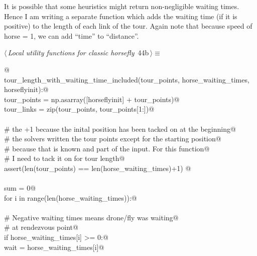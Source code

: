 \documentclass[11.5pt]{report}
\begin{document}
\vspace{-0.8cm}\newchunk It is possible that some heuristics might return non-negligible
      waiting times. Hence I am writing a separate function which
      adds the waiting time (if it is positive) to the length of 
      each link of the tour. Again note that because 
      speed of horse = 1, we can add ``time'' to ``distance''. 

\begin{flushleft} \small\label{scrap53}\raggedright\small
{} $\langle\,${\itshape Local utility functions for classic horsefly}\nobreak\ {\footnotesize {44b}}$\,\rangle\equiv$
\vspace{-1ex}
\begin{list}{}{} \item
\mbox{}\verb@   @\\
\mbox{}\verb@def tour_length_with_waiting_time_included(tour_points, horse_waiting_times, horseflyinit):@\\
\mbox{}\verb@      tour_points   = np.asarray([horseflyinit] + tour_points)@\\
\mbox{}\verb@      tour_links    = zip(tour_points, tour_points[1:])@\\
\mbox{}\verb@@\\
\mbox{}\verb@      # the +1 because the inital position has been tacked on at the beginning@\\
\mbox{}\verb@      # the solvers written the tour points except for the starting position@\\
\mbox{}\verb@      # because that is known and part of the input. For this function@\\
\mbox{}\verb@      # I need to tack it on for tour length@\\
\mbox{}\verb@      assert(len(tour_points) == len(horse_waiting_times)+1) @\\
\mbox{}\verb@@\\
\mbox{}\verb@      sum = 0@\\
\mbox{}\verb@      for i in range(len(horse_waiting_times)):@\\
\mbox{}\verb@@\\
\mbox{}\verb@          # Negative waiting times means drone/fly was waiting@\\
\mbox{}\verb@          # at rendezvous point@\\
\mbox{}\verb@          if horse_waiting_times[i] >= 0:@\\
\mbox{}\verb@              wait = horse_waiting_times[i]@\\

\end{list}
\end{flushleft}
\end{document}
